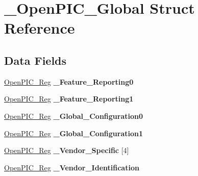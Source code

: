 \hypertarget{struct__OpenPIC__Global}{}\section{\+\_\+\+Open\+P\+I\+C\+\_\+\+Global Struct Reference}
\label{struct__OpenPIC__Global}
\subsection*{Data Fields}
\begin{DoxyCompactItemize}
\item 
\mbox{\label{struct__OpenPIC__Global_aa6874f1ee8f07a9808861c65ac2bdeb1}} 
\mbox{\hyperlink{struct__OpenPIC__Reg}{Open\+P\+I\+C\+\_\+\+Reg}} {\bfseries \+\_\+\+Feature\+\_\+\+Reporting0}
\item 
\mbox{\label{struct__OpenPIC__Global_a09618685d054673813ff63526edaa00c}} 
\mbox{\hyperlink{struct__OpenPIC__Reg}{Open\+P\+I\+C\+\_\+\+Reg}} {\bfseries \+\_\+\+Feature\+\_\+\+Reporting1}
\item 
\mbox{\label{struct__OpenPIC__Global_af02edc74d922bb5fb59921597b84321b}} 
\mbox{\hyperlink{struct__OpenPIC__Reg}{Open\+P\+I\+C\+\_\+\+Reg}} {\bfseries \+\_\+\+Global\+\_\+\+Configuration0}
\item 
\mbox{\label{struct__OpenPIC__Global_aa3b1671ab8cc945e2c4a0b4b64e1eceb}} 
\mbox{\hyperlink{struct__OpenPIC__Reg}{Open\+P\+I\+C\+\_\+\+Reg}} {\bfseries \+\_\+\+Global\+\_\+\+Configuration1}
\item 
\mbox{\label{struct__OpenPIC__Global_aecdc0af638d17caa32512423da3bfc2b}} 
\mbox{\hyperlink{struct__OpenPIC__Reg}{Open\+P\+I\+C\+\_\+\+Reg}} {\bfseries \+\_\+\+Vendor\+\_\+\+Specific} \mbox{[}4\mbox{]}
\item 
\mbox{\label{struct__OpenPIC__Global_a586f598b4cf0b10f8b1f07f5cb28003b}} 
\mbox{\hyperlink{struct__OpenPIC__Reg}{Open\+P\+I\+C\+\_\+\+Reg}} {\bfseries \+\_\+\+Vendor\+\_\+\+Identification}
\item 
\mbox{\label{struct__OpenPIC__Global_a79c7119fe15391953a44a6e660d3587b}} 

\end{DoxyCompactItemize}
